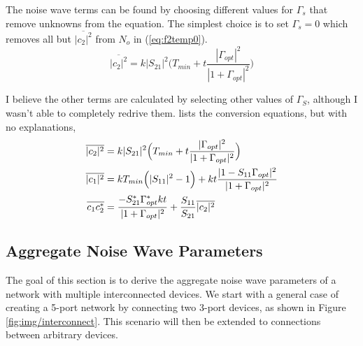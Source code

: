 \documentclass[journal]{IEEEtran}
\begin{document}
The noise wave terms can be found by choosing different values for \(\Gamma_s\) that remove unknowns from the equation. The simplest choice is to set \(\Gamma_s=0\) which removes all but \(\overline{|c_2|^2}\) from \(N_o\) in (\ref{eq:f2temp0}).
\[\overline{|c_2|^2} = k|S_{21}|^2 \Big({T_{min} } + t \frac{|\Gamma_{opt}|^2}{|1+\Gamma_{opt}|^2} \Big)\]

I believe the other terms are calculated by selecting other values of \(\Gamma_S\), although I wasn't able to completely redrive them. \cite{b3} lists the conversion equations, but with no explanations,
\begin{align}
	\overline{|c_2|^2} &= k|S_{21}|^2 \Big({T_{min} } + t \frac{|\Gamma_{opt}|^2}{|1+\Gamma_{opt}|^2} \Big)\label{eq:np1} \\
	\overline{|c_1|^2} &= kT_{min} \Big(|S_{11}|^2 -1 \Big) + kt{|1 - S_{11} \Gamma_{opt}|^2 \over |1 + \Gamma_{opt}|^2} \\
	\overline{c_1 c_2^*} &= { -S_{21}^* \Gamma_{opt}^* kt \over |1 + \Gamma_{opt}|^2} + {S_{11} \over S_{21}} \overline{|c_2|^2} \label{eq:np3}
\end{align}


\subsection{Aggregate Noise Wave Parameters}
The goal of this section is to derive the aggregate noise wave parameters of a network with multiple interconnected devices. We start with a general case of creating a 5-port network by connecting two 3-port devices, as shown in Figure \ref{fig:img/interconnect}. This scenario will then be extended to connections between arbitrary devices. 

\texenv\figure[file=img/interconnect, caption={\small Aggregate 5-port network created from two 3-port devices (D1 and D2)  connected at ports 2 and 1 respectively.}, width=3.5in, placement=b]
\end{document}
